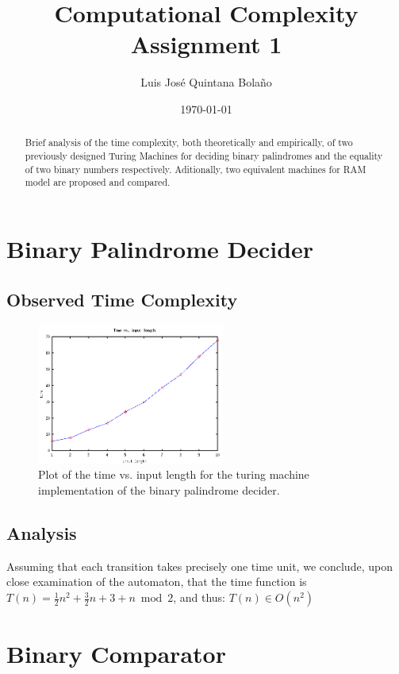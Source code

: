 \documentclass[a4paper]{article}
\title{Computational Complexity\\ Assignment 1 }
\author{Luis José Quintana Bolaño}
\date{\today}
\begin{document}
	\maketitle
	\begin{abstract}
	    Brief analysis of the time complexity, both theoretically and empirically, of two previously designed Turing Machines for deciding binary palindromes and the equality of two binary numbers respectively. Aditionally, two equivalent machines for RAM model are proposed and compared.
  	\end{abstract}
	\section{Binary Palindrome Decider}
	    \subsection{Observed Time Complexity}
		    \begin{figure}[!h]
  			\centering
  			\includegraphics[width=0.55\textwidth,clip]{timepalindrometuring.png}
  			\caption{Plot of the time vs. input length for the turing machine implementation of the binary palindrome decider.}
  			\end{figure}
  		\subsection{Analysis}
  		    Assuming that each transition takes precisely one time unit, we conclude, upon close examination of the automaton, that the time function is $ T(n)=\frac1 2 n^2+\frac3 2 n+3+n\bmod2 $, and thus: $T(n)\in O(n^2)$
    \newpage
    \section{Binary Comparator}
\end{document}
